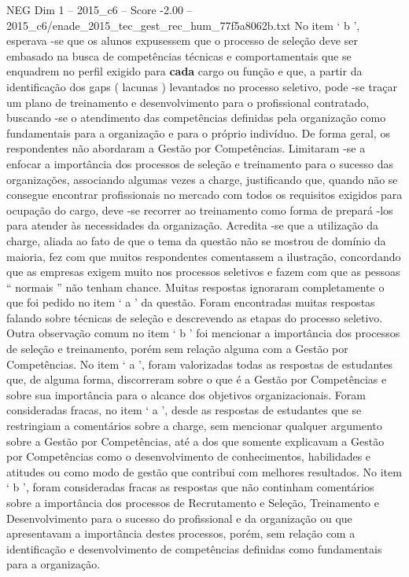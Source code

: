 \begin{textsample}{NEG Dim 1 – 2015\_c6 – Score -2.00 – 2015\_c6/enade\_2015\_tec\_gest\_rec\_hum\_77f5a8062b.txt}
No item ‘ b ’, esperava -se que os alunos expusessem que o processo de seleção deve ser embasado na busca de competências técnicas e comportamentais que se enquadrem no perfil exigido para \textbf{cada} cargo ou função e que, a partir da identificação dos gaps ( lacunas ) levantados no processo seletivo, pode -se traçar um plano de treinamento e desenvolvimento para o profissional contratado, buscando -se o atendimento das competências definidas pela organização como fundamentais para a organização e para o próprio indivíduo.
De forma geral, os respondentes não abordaram a Gestão por Competências.
Limitaram -se a enfocar a importância dos processos de seleção e treinamento para o sucesso das organizações, associando algumas vezes a charge, justificando que, quando não se consegue encontrar profissionais no mercado com todos os requisitos exigidos para ocupação do cargo, deve -se recorrer ao treinamento como forma de prepará -los para atender às necessidades da organização.
Acredita -se que a utilização da charge, aliada ao fato de que o tema da questão não se mostrou de domínio da maioria, fez com que muitos respondentes comentassem a ilustração, concordando que as empresas exigem muito nos processos seletivos e fazem com que as pessoas “ normais ” não tenham chance.
Muitas respostas ignoraram completamente o que foi pedido no item ‘ a ’ da questão.
Foram encontradas muitas respostas falando sobre técnicas de seleção e descrevendo as etapas do processo seletivo.
Outra observação comum no item ‘ b ’ foi mencionar a importância dos processos de seleção e treinamento, porém sem relação alguma com a Gestão por Competências.
No item ‘ a ’, foram valorizadas todas as respostas de estudantes que, de alguma forma, discorreram sobre o que é a Gestão por Competências e sobre sua importância para o alcance dos objetivos organizacionais.
Foram consideradas fracas, no item ‘ a ’, desde as respostas de estudantes que se restringiam a comentários sobre a charge, sem mencionar qualquer argumento sobre a Gestão por Competências, até a dos que somente explicavam a Gestão por Competências como o desenvolvimento de conhecimentos, habilidades e atitudes ou como modo de gestão que contribui com melhores resultados.
No item ‘ b ’, foram consideradas fracas as respostas que não continham comentários sobre a importância dos processos de Recrutamento e Seleção, Treinamento e Desenvolvimento para o sucesso do profissional e da organização ou que apresentavam a importância destes processos, porém, sem relação com a identificação e desenvolvimento de competências definidas como fundamentais para a organização.

\end{textsample}
